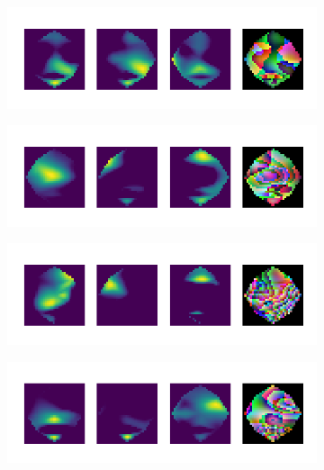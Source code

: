 \documentclass{article}
\begin{document}
\begin{figure}[h!]
 \caption{a,b,c,d - examples of the image frames of the data. First three columns show the activity in the separate frequency bands - the RGB channels of the image. The final triple channel image is shown in the fourth column.}
 \begin{subfigure}{.5\textwidth}
   \centering
   \includegraphics[width=1\linewidth]{2_cropped.png}
   \caption{}
 \end{subfigure}
 \begin{subfigure}{.5\textwidth}
   \centering
   \includegraphics[width=1\linewidth]{4_cropped.png}
   \caption{}
 \end{subfigure}
 \begin{subfigure}{.5\textwidth}
   \centering
   \includegraphics[width=1\linewidth]{6_cropped.png}
   \caption{}
 \end{subfigure}
 \begin{subfigure}{.5\textwidth}
   \centering
   \includegraphics[width=1\linewidth]{9_cropped.png}
   \caption{}
 \end{subfigure}
\end{figure}
\end{document}
